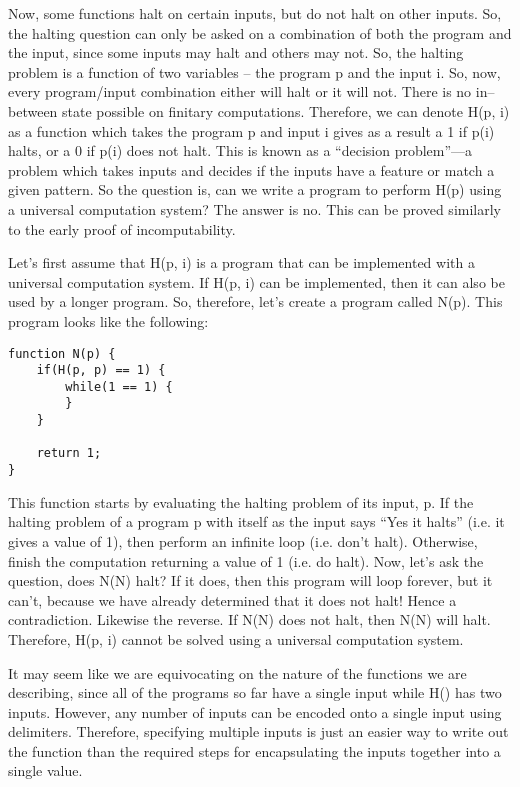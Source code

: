 Now, some functions halt on certain inputs, but do not halt on other inputs.  So, the halting question can only be asked on a combination of both the program and the input, since some inputs may halt and others may not.  So, the halting problem is a function of two variables -- the program p and the input i.  So, now, every program/input combination either will halt or it will not.  There is no in--between state possible on finitary computations.  Therefore, we can denote H(p, i) as a function which takes the program p and input i gives as a result a 1 if p(i) halts, or a 0 if p(i) does not halt.  This is known as a ``decision problem''---a problem which takes inputs and decides if the inputs have a feature or match a given pattern.  So the question is, can we write a program to perform H(p) using a universal computation system?  The answer is no.  This can be proved similarly to the early proof of incomputability.  

Let's first assume that H(p, i) is a program that can be implemented with a universal computation system.  If H(p, i) can be implemented, then it can also be used by a longer program.  So, therefore, let's create a program called N(p).  This program looks like the following:

\begin{verbatim}
function N(p) {
	if(H(p, p) == 1) {
		while(1 == 1) {
		}
	}

	return 1;
}
\end{verbatim}

This function starts by evaluating the halting problem of its input, p.  If the halting problem of a program p with itself as the input says ``Yes it halts'' (i.e. it gives a value of 1), then perform an infinite loop (i.e. don't halt).  Otherwise, finish the computation returning a value of 1 (i.e. do halt).  Now, let's ask the question, does N(N) halt?  If it does, then this program will loop forever, but it can't, because we have already determined that it does not halt!  Hence a contradiction.  Likewise the reverse.  If N(N) does not halt, then N(N) will halt. Therefore, H(p, i) cannot be solved using a universal computation system.

It may seem like we are equivocating on the nature of the functions we are describing, since all of the programs so far have a single input while H() has two inputs.  However, any number of inputs can be encoded onto a single input using delimiters.  Therefore, specifying multiple inputs is just an easier way to write out the function than the required steps for encapsulating the inputs together into a single value.

